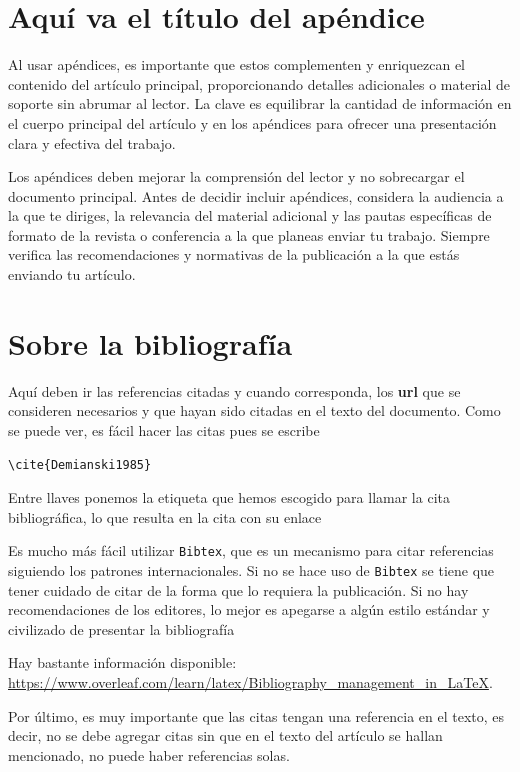\documentclass[spanish,notitlepage,letterpaper,11pt]{article} %
\begin{document}
\section{Aquí va el título del apéndice}
Al usar apéndices, es importante que estos complementen y enriquezcan el contenido del artículo principal, proporcionando detalles adicionales o material de soporte sin abrumar al lector. La clave es equilibrar la cantidad de información en el cuerpo principal del artículo y en los apéndices para ofrecer una presentación clara y efectiva del trabajo.

Los apéndices deben mejorar la comprensión del lector y no sobrecargar el documento principal. Antes de decidir incluir apéndices, considera la audiencia a la que te diriges, la relevancia del material adicional y las pautas específicas de formato de la revista o conferencia a la que planeas enviar tu trabajo. Siempre verifica las recomendaciones y normativas de la publicación a la que estás enviando tu artículo.

\section*{Sobre la bibliografía}

Aquí deben ir las referencias citadas \cite{Narasimhan1993, Chandra1950} y cuando corresponda, los {\bf url} que se consideren necesarios y que hayan sido citadas en el texto del documento. Como se puede ver, es fácil  hacer las citas pues se escribe 
\begin{verbatim}\cite{Demianski1985}\end{verbatim}

Entre llaves ponemos la etiqueta que hemos escogido para llamar la cita bibliográfica, lo que resulta en la cita con su enlace \cite{Demianski1985}

Es mucho más fácil utilizar \texttt{Bibtex}, que es un mecanismo para citar referencias siguiendo los patrones internacionales. Si no se hace uso de \texttt{Bibtex} se tiene que tener cuidado de citar de la forma que lo requiera la publicación. Si no hay recomendaciones de los editores, lo mejor es apegarse a algún estilo estándar y civilizado de presentar la bibliografía 

Hay bastante información disponible:\\
\url{https://www.overleaf.com/learn/latex/Bibliography_management_in_LaTeX}. 

Por último, es muy importante que las citas tengan  una  referencia en el texto, es decir, no se debe agregar citas sin que en el texto del artículo se hallan mencionado, no puede haber referencias solas. 
\end{document}
